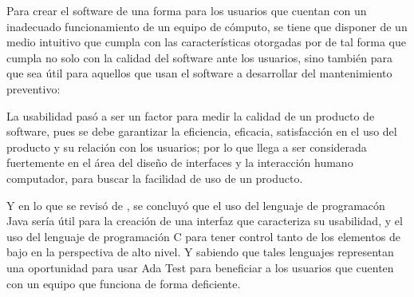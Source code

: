 Para crear el software de una forma para los usuarios que cuentan con un
inadecuado funcionamiento de un equipo de cómputo, se tiene que disponer de un
medio intuitivo que cumpla con las características otorgadas por
\textcite{Mena2022} de tal forma que cumpla no solo con la calidad del software
ante los usuarios, sino también para que sea útil para aquellos que usan el
software a desarrollar del mantenimiento preventivo:

\begin{displayquote}
  La usabilidad pasó a ser un factor para medir la calidad de un producto de
  software, pues se debe garantizar la eficiencia, eficacia, satisfacción en el
  uso del producto y su relación con los usuarios; por lo que llega a ser
  considerada fuertemente en el área del diseño de interfaces y la interacción
  humano computador, para buscar la facilidad de uso de un producto.
\end{displayquote}

Y en lo que se revisó de \textcite{Trejos2023}, se concluyó que el uso del
lenguaje de programacón Java sería útil para la creación de una interfaz que
caracteriza su usabilidad, y el uso del lenguaje de programación C para tener
control tanto de los elementos de bajo en la perspectiva de alto nivel. Y 
sabiendo que tales lenguajes representan una oportunidad para usar Ada Test para
beneficiar a los usuarios que cuenten con un equipo que funciona de forma
deficiente.
